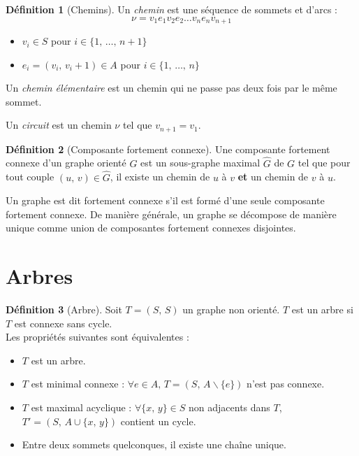 \documentclass[11pt,english,french]{scrreprt}
\theoremstyle{remark}
\theoremstyle{definition}
\newtheorem*{def*}{Définition}
\begin{document}
\begin{def*}[Chemins]
	Un \emph{chemin} est une séquence de sommets et d'arcs :
	\begin{displaymath}
		\nu = v_1 e_1 v_2 e_2\dots v_n e_n v_{n+1}
	\end{displaymath}
	\begin{itemize}
		\item $v_i\in S$ pour $i\in\{1,\,\dots,\,n+1\}$
		\item $e_i = (v_i,\,v_i+1)\in A$ pour $i\in\{1,\,\dots,\,n\}$
	\end{itemize}
	
	Un \emph{chemin élémentaire} est un chemin qui ne passe pas deux fois par le même sommet.

	Un \emph{circuit} est un chemin $\nu$ tel que $v_{n+1}=v_1$.
\end{def*}

\begin{def*}[Composante fortement connexe]
	Une composante fortement connexe d'un graphe orienté $G$ est un sous-graphe maximal $\hat{G}$ de $G$ tel que pour tout couple $(u,\,v)\in \hat{G}$, il existe un chemin de $u$ à $v$ \textbf{et} un chemin de $v$ à $u$.
	
	Un graphe est dit fortement connexe s'il est formé d'une seule composante fortement connexe. De manière générale, un graphe se décompose de manière unique comme union de composantes fortement connexes disjointes.
\end{def*}

\section{Arbres} %

\begin{def*}[Arbre]
	Soit $T=(S,\,S)$ un graphe non orienté. $T$ est un arbre si $T$ est connexe sans cycle.\\
	Les propriétés suivantes sont équivalentes :
	\begin{itemize}
		\item $T$ est un arbre.
		\item $T$ est minimal connexe : $\forall e\in A,\,T=(S,\,A\backslash \{e\})$ n'est pas connexe.
		\item $T$ est maximal acyclique : $\forall \{x,\,y\}\in S$ non adjacents dans $T$, $T'=(S,\,A\cup \{x,\,y\})$ contient un cycle.
		\item Entre deux sommets quelconques, il existe une chaîne unique.
	\end{itemize}
\end{def*}
\end{document}

